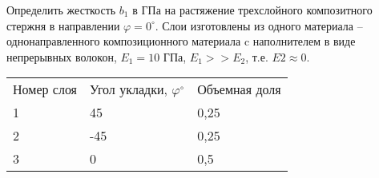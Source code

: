 

Определить жесткость $b_1$ в ГПа на растяжение трехслойного композитного стержня в направлении $\varphi = 0^{\circ}$.
Слои изготовлены из одного материала – однонаправленного композиционного материала c наполнителем в 
виде непрерывных волокон, $E_1=10$ ГПа, $E_1>>E_2$, т.е. $E2 \approx 0$.

\begin{tabular}{l l l}
    Номер слоя & Угол укладки, $\varphi^{\circ}$ & Объемная доля \\
    1 & 45 & 0,25 \\
    2 & -45 & 0,25 \\
    3 &  0  & 0,5
\end{tabular}\\